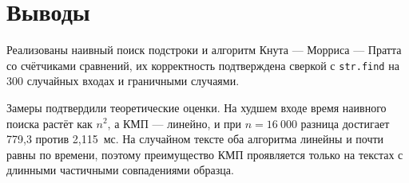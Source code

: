 \section{Выводы}
Реализованы наивный поиск подстроки и алгоритм Кнута — Морриса — Пратта со счётчиками
сравнений, их корректность подтверждена сверкой с \texttt{str.find} на 300 случайных входах и
граничными случаями.

Замеры подтвердили теоретические оценки. На худшем входе время наивного поиска растёт как
$n^2$, а КМП — линейно, и при $n = 16~000$ разница достигает 779,3 против 2,115~мс. На
случайном тексте оба алгоритма линейны и почти равны по времени, поэтому преимущество КМП
проявляется только на текстах с длинными частичными совпадениями образца.
